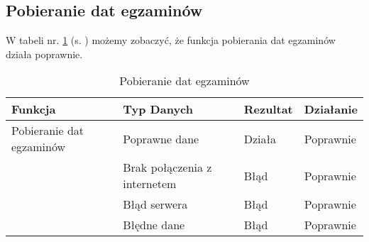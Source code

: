 \subsection{Pobieranie dat egzaminów}
W tabeli nr. \ref{tab:tabelka016} (s. \pageref{tab:tabelka016}) możemy zobaczyć, że funkcja pobierania dat egzaminów działa poprawnie.
\begin{table}[h!]
	\centering
	\begin{tabularx}{\textwidth}{|X|>{\arraybackslash}m{}|X|X|}
		\hline
		\textbf{Funkcja}         & \textbf{Typ Danych}          & \textbf{Rezultat} & \textbf{Działanie} \\ \hline
		Pobieranie dat egzaminów & Poprawne dane                & Działa            & Poprawnie          \\ \hline
		                         & Brak połączenia z internetem & Błąd              & Poprawnie          \\ \hline
		                         & Błąd serwera                 & Błąd              & Poprawnie          \\ \hline
		                         & Błędne dane                  & Błąd              & Poprawnie          \\ \hline
	\end{tabularx}
	\caption{Pobieranie dat egzaminów}
	\label{tab:tabelka016}
\end{table}
